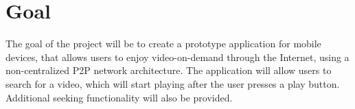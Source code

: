 \section{Goal}
The goal of the project will be to create a prototype application for mobile devices, that allows users to enjoy video-on-demand through the Internet, using a non-centralized P2P network architecture. The application will allow users to search for a video, which will start playing after the user presses a play button. Additional seeking functionality will also be provided.
